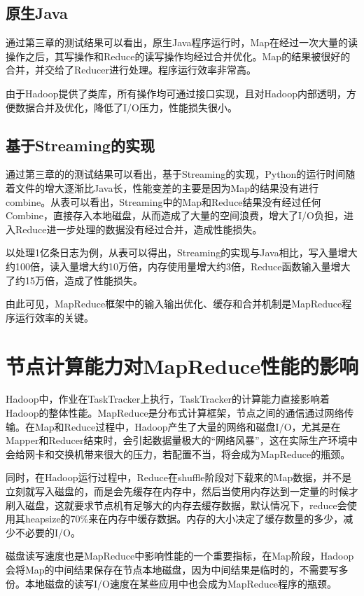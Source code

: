 \subsection{原生Java}
通过第三章的测试结果可以看出，原生Java程序运行时，Map在经过一次大量的读操作之后，其写操作和Reduce的读写操作均经过合并优化。Map的结果被很好的合并，并交给了Reducer进行处理。程序运行效率非常高。

由于Hadoop提供了类库，所有操作均可通过接口实现，且对Hadoop内部透明，方便数据合并及优化，降低了I/O压力，性能损失很小。

\subsection{基于Streaming的实现}
通过第三章的的测试结果可以看出，基于Streaming的实现，Python的运行时间随着文件的增大逐渐比Java长，性能变差的主要是因为Map的结果没有进行combine。从表可以看出，Streaming中的Map和Reduce结果没有经过任何Combine，直接存入本地磁盘，从而造成了大量的空间浪费，增大了I/O负担，进入Reduce进一步处理的数据没有经过合并，造成性能损失。

以处理1亿条日志为例，从表可以得出，Streaming的实现与Java相比，写入量增大约100倍，读入量增大约10万倍，内存使用量增大约3倍，Reduce函数输入量增大了约15万倍，造成了性能损失。

由此可见，MapReduce框架中的输入输出优化、缓存和合并机制是MapReduce程序运行效率的关键。

\section{节点计算能力对MapReduce性能的影响}
Hadoop中，作业在TaskTracker上执行，TaskTracker的计算能力直接影响着Hadoop的整体性能。MapReduce是分布式计算框架，节点之间的通信通过网络传输。在Map和Reduce过程中，Hadoop产生了大量的网络和磁盘I/O，尤其是在Mapper和Reducer结束时，会引起数据量极大的“网络风暴”，这在实际生产环境中会给网卡和交换机带来很大的压力，若配置不当，将会成为MapReduce的瓶颈。

同时，在Hadoop运行过程中，Reduce在shuffle阶段对下载来的Map数据，并不是立刻就写入磁盘的，而是会先缓存在内存中，然后当使用内存达到一定量的时候才刷入磁盘，这就要求节点机有足够大的内存去缓存数据，默认情况下，reduce会使用其heapsize的70\%来在内存中缓存数据。内存的大小决定了缓存数量的多少，减少不必要的I/O。

磁盘读写速度也是MapReduce中影响性能的一个重要指标，在Map阶段，Hadoop会将Map的中间结果保存在节点本地磁盘，因为中间结果是临时的，不需要写多份。本地磁盘的读写I/O速度在某些应用中也会成为MapReduce程序的瓶颈。

